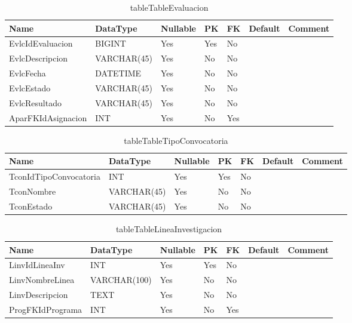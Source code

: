 \begin{table}
	\caption{tableTableEvaluacion}
	\label{labelTableEvaluacion}
	\begin{tabular}{ |l|l|l|l|l|l|l| }
		\hline
		Name & DataType & Nullable & PK & FK & Default & Comment \\ \hline
		EvlcIdEvaluacion & BIGINT & Yes & Yes & No &  & \\ \hline 
		EvlcDescripcion & VARCHAR(45) & Yes & No & No &  & \\ \hline 
		EvlcFecha & DATETIME & Yes & No & No &  & \\ \hline 
		EvlcEstado & VARCHAR(45) & Yes & No & No &  & \\ \hline 
		EvlcResultado & VARCHAR(45) & Yes & No & No &  & \\ \hline 
		AparFKIdAsignacion & INT & Yes & No & Yes &  & \\ \hline 
		
	\end{tabular}
\end{table}


\begin{table}
	\caption{tableTableTipoConvocatoria}
	\label{labelTableTipoConvocatoria}
	\begin{tabular}{ |l|l|l|l|l|l|l| }
		\hline
		Name & DataType & Nullable & PK & FK & Default & Comment \\ \hline
		TconIdTipoConvocatoria & INT & Yes & Yes & No &  & \\ \hline 
		TconNombre & VARCHAR(45) & Yes & No & No &  & \\ \hline 
		TconEstado & VARCHAR(45) & Yes & No & No &  & \\ \hline 
		
	\end{tabular}
\end{table}


\begin{table}
	\caption{tableTableLineaInvestigacion}
	\label{labelTableLineaInvestigacion}
	\begin{tabular}{ |l|l|l|l|l|l|l| }
		\hline
		Name & DataType & Nullable & PK & FK & Default & Comment \\ \hline
		LinvIdLineaInv & INT & Yes & Yes & No &  & \\ \hline 
		LinvNombreLinea & VARCHAR(100) & Yes & No & No &  & \\ \hline 
		LinvDescripcion & TEXT & Yes & No & No &  & \\ \hline 
		ProgFKIdPrograma & INT & Yes & No & Yes &  & \\ \hline 
		
	\end{tabular}
\end{table}


